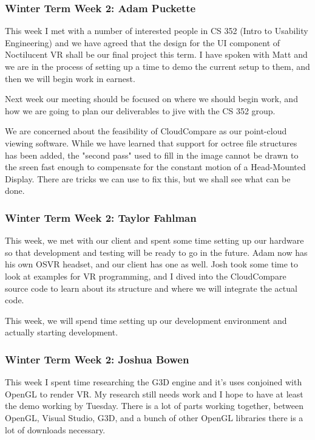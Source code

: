 \documentclass[draftclsnofoot,onecolumn]{IEEEtran}
\begin{document}
\subsubsection{Winter Term Week 2: Adam Puckette}

This week I met with a number of interested people in CS 352 (Intro to Usability Engineering) and we have agreed that the design for the UI component of Noctilucent VR shall be our final project this term. I have spoken with Matt and we are in the process of setting up a time to demo the current setup to them, and then we will begin work in earnest.

Next week our meeting should be focused on where we should begin work, and how we are going to plan our deliverables to jive with the CS 352 group.

We are concerned about the feasibility of CloudCompare as our point-cloud viewing software. While we have learned that support for octree file structures has been added, the "second pass" used to fill in the image cannot be drawn to the sreen fast enough to compensate for the constant motion of a Head-Mounted Display. There are tricks we can use to fix this, but we shall see what can be done.

\subsubsection{Winter Term Week 2: Taylor Fahlman}

This week, we met with our client and spent some time setting up our hardware so that development and testing will be ready to go in the future. Adam now has his own OSVR headset, and our client has one as well. Josh took some time to look at examples for VR programming, and I dived into the CloudCompare source code to learn about its structure and where we will integrate the actual code.

This week, we will spend time setting up our development environment and actually starting development.

\subsubsection{Winter Term Week 2: Joshua Bowen}

This week I spent time researching the G3D engine and it's uses conjoined with OpenGL to render VR. My research still needs work and I hope to have at least the demo working by Tuesday. There is a lot of parts working together, between OpenGL, Visual Studio, G3D, and a bunch of other OpenGL libraries there is a lot of downloads necessary.
\end{document}
